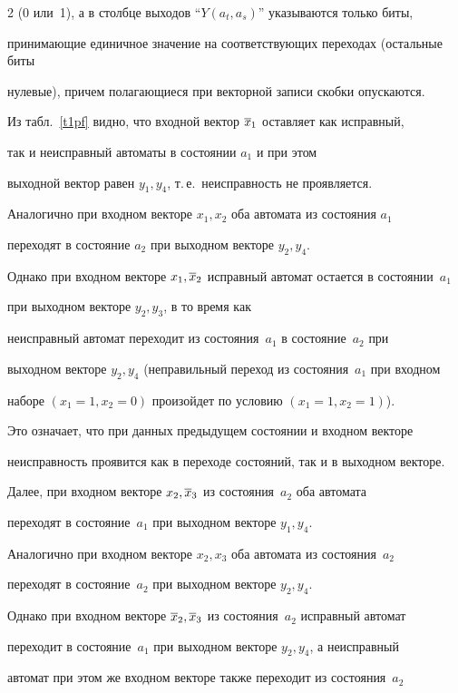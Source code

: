 \begin{multicols}{2}
(0 или~1), а в столбце выходов ``$Y(a_t,a_s)$'' указываются только биты,


принимающие единичное значение на соответствующих переходах (остальные биты


нулевые), причем полагающиеся при векторной записи скобки опускаются.





 Из табл.~\ref{t1pf} видно, что входной вектор $\overline x_1$ остав\-ля\-ет как исправный,


так и неисправный автоматы в состоянии $a_1$ и при этом


выходной вектор равен $y_1,y_4$, т.\,е.\ неисправность не проявляется.


Аналогично при входном векторе $x_1,x_2$ оба автомата из состояния $a_1$


переходят в состояние $a_2$ при выходном векторе $y_2,y_4$.


Однако при входном векторе $x_1,\overline x_2$ исправный автомат остается в состоянии~$a_1$


при выходном векторе $y_2,y_3$, в то время как


неисправный автомат переходит из состояния~$a_1$ в состояние~$a_2$ при


выходном векторе $y_2,y_4$ (неправильный переход из состояния~$a_1$ при входном


наборе $(x_1=1, x_2=0)$ произойдет по условию $(x_1=1, x_2=1)$).


Это означает, что при данных предыдущем состоянии и входном векторе


неисправность проявится как в переходе состояний, так и в выходном векторе.





 Далее, при входном векторе $x_2,\overline x_3$ из состояния~$a_2$ оба автомата


переходят в со\-сто\-яние~$a_1$ при выходном векторе $y_1,y_4$.


Аналогично при входном векторе $x_2,x_3$ оба автомата из состояния~$a_2$


переходят в со\-сто\-яние~$a_2$ при выходном векторе $y_2,y_4$.


Однако при входном векторе $\overline x_2,\overline x_3$ из со\-сто\-яния~$a_2$ исправный автомат


переходит в со\-сто\-яние~$a_1$ при выходном векторе $y_2,y_4$, а неисправный


автомат при этом же входном векторе также переходит из со\-сто\-яния~$a_2$



\end{multicols}
